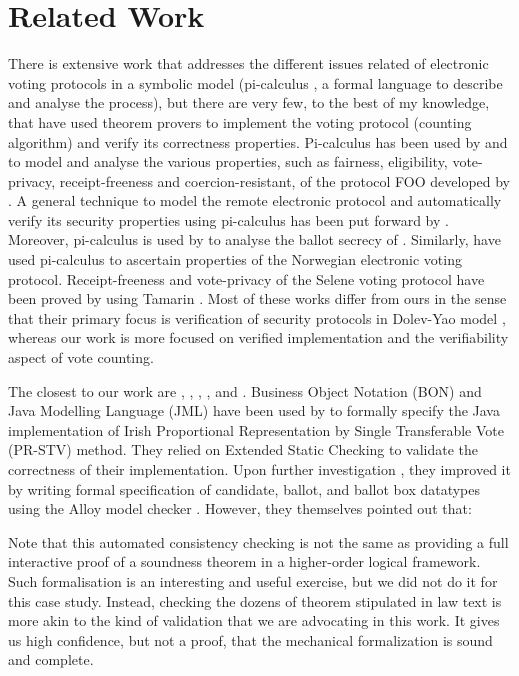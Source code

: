 \section{Related Work}
 There is extensive work that 
 addresses the different issues related of electronic voting protocols  in a symbolic model (pi-calculus  
 \citep{10.5555/329902} \citep{10.1145/373243.360213}, 
 a formal language to describe and analyse the process), 
 but there are very few, to the best of my knowledge, 
 that have used theorem provers to implement the voting protocol (counting algorithm)
 and verify its correctness properties.  Pi-calculus
 has been used by \citep{10.1007/978-3-540-31987-0_14} and  \citep{Delaune2010} 
 to model and analyse the various properties, such as fairness, eligibility, vote-privacy, receipt-freeness and 
 coercion-resistant,  of the protocol FOO developed by \citep{10.1007/3-540-57220-1_66}. 
 A general technique to model the remote electronic protocol 
 and automatically verify  its security properties using pi-calculus has been 
 put forward by \citep{Backes:2008:AVR:1380848.1381255}. Moreover, 
 pi-calculus is used by \citep{5992139} to analyse the ballot secrecy of \citep{Helios:2016:HVS}. 
 Similarly, \citep{10.1007/978-3-642-28641-4_7} have used pi-calculus to ascertain properties of 
 the Norwegian electronic voting protocol. 
 Receipt-freeness and vote-privacy of the Selene voting protocol \citep{Selene} have been 
 proved by \citep{10.1007/978-3-319-68687-5_7}  using Tamarin \citep{10.5555/2958031.2958047}.
 Most of these works differ from ours
 in the sense that their primary focus is verification of security protocols in  
 Dolev-Yao model \citep{1056650}, whereas our work is 
 more focused on verified implementation and  the verifiability  aspect of vote counting.

 The closest to our work are \citep{Cochran:2010:VFS} \citep{DeYoung:2012:LLV}, \citep{Pattinson:2015:VCM}, \citep{Pattinson:2016:MSP},
 \citep{Verity:2017:FVI:3014812.3014845}, and \citep{Ghale:2017:FVS}.
 Business Object Notation (BON) and Java Modelling Language (JML)  have been used by \citep{Cochran:2010:VFS} to formally specify the
 Java implementation of  Irish Proportional  Representation  by  Single  Transferable  Vote  (PR-STV) 
 method.  They relied on Extended Static Checking to validate the correctness of their 
 implementation. Upon further investigation \citep{Cochran:2013:FMB}, they improved it 
 by writing formal specification of  candidate, ballot, and ballot box datatypes 
 using the Alloy model checker \citep{10.1145/505145.505149}. However, they themselves pointed out that:
 \begin{displayquote}
 Note that this automated consistency checking is not the same as providing a 
 full interactive proof of a soundness theorem in a higher-order logical framework.
 Such formalisation is an interesting and useful exercise, but we did not do it for this 
 case study. Instead, checking the dozens of theorem stipulated in law text is more 
 akin to the kind of validation that we are advocating in this work. 
 It gives us high confidence, but not a proof, that the mechanical formalization is
  sound and complete.
  \end{displayquote}
 
